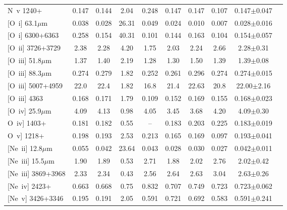 \documentclass[twocolumn]{aastex62}
\begin{document}
\begin{CJK*}{UTF8}{gbsn}
\begin{table*}
\begin{center}
\begin{minipage}{13.5cm}
\begin{tabular}{@{}lccccccccc}
{N~\sc v} 1240+                      & 0.147  & 0.144  &  2.04    & 0.248  & 0.147    & 0.147    & 0.107  & 0.147$\pm$0.047\\
{[O~\sc i]} 63.1$\mu$m           & 0.038  & 0.028  &  26.31    & 0.049  & 0.024    & 0.010    & 0.007  & 0.028$\pm$0.016\\
{[O~\sc i]} 6300+6363             & 0.258  & 0.154  &  40.31    & 0.101  & 0.144    & 0.163    & 0.104  & 0.154$\pm$0.057\\
{[O~\sc ii]} 3726+3729            & 2.38     & 2.28   &  4.20    & 1.75    & 2.03      & 2.24      & 2.66  & 2.28$\pm$0.31\\
{[O~\sc iii]} 51.8$\mu$m          & 1.37    & 1.40   &  2.19    & 1.28    & 1.30      & 1.50      & 1.39  &  1.39$\pm$0.08\\
{[O~\sc iii]} 88.3$\mu$m          & 0.274  & 0.279 &  1.82    & 0.252  & 0.261    & 0.296    & 0.274 & 0.274$\pm$0.015 \\
{[O~\sc iii]} 5007+4959            & 22.0    & 22.4   &  1.82    & 16.8    & 21.4       & 22.63    & 20.8  & 22.00$\pm$2.16\\
{[O~\sc iii]} 4363                      & 0.168  & 0.171 &  1.79    & 0.109   & 0.152     & 0.169   & 0.155  & 0.168$\pm$0.023\\
{[O~\sc iv]} 25.9$\mu$m          & 4.09    & 4.13   &  0.98    & 4.05     & 3.45      & 3.68      & 4.20  & 4.09$\pm$0.30\\
{O~\sc iv]} 1403+                     & 0.181  & 0.182  & 0.55     & --         & 0.183    & 0.203     & 0.225  & 0.183$\pm$0.019 \\
{O~\sc v]} 1218+                      & 0.198  & 0.193  & 2.53     & 0.213   & 0.165    & 0.169     & 0.097  & 0.193$\pm$0.041\\
{[Ne~\sc ii]} 12.8$\mu$m         & 0.055  & 0.042   & 23.64     & 0.043   & 0.028    & 0.030      & 0.027  & 0.042$\pm$0.011\\
{[Ne~\sc iii]} 15.5$\mu$m        & 1.90    & 1.89     & 0.53     & 2.71     & 1.88      & 2.02       & 2.76    & 2.02$\pm$0.42\\
{[Ne~\sc iii]} 3869+3968          & 2.33    & 2.34     & 0.43     & 2.56     & 2.64      & 2.63       & 3.04    & 2.63$\pm$0.26\\
{[Ne~\sc iv]} 2423+                  & 0.663  & 0.668   & 0.75     & 0.832   & 0.707   & 0.749      & 0.723  &  0.723$\pm$0.062\\
{[Ne~\sc v]} 3426+3346          & 0.195   & 0.191   & 2.05     & 0.591   & 0.721    & 0.692     & 0.583  & 0.591$\pm$0.241\\

\end{tabular}
\end{minipage}
\end{center}
\end{table*}
\end{CJK*}
\end{document}
